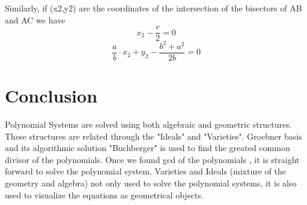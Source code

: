 \documentclass[11pt]{article}
\begin{document}
Similarly, if (x2,y2) are the coordinates of the intersection of the bisectors of AB and AC we have
\begin{equation}
    x_2- \frac {c}{2}=0
\end{equation}
\begin{equation}
    \frac {a}{b} \cdotp x_2 + y_2 - \frac {b^2 + a^2}{2b} = 0
\end{equation}

\section{Conclusion}
Polynomial Systems are solved using both algebraic and geometric structures. These structures are related through the "Ideals" and "Varieties". Groebner basis and its algorithmic solution "Buchberger" is used to find the greated common divisor of the polynomials. Once we found gcd of the polynomials , it is straight forward to solve the polynomial system.
Varieties and Ideals (mixture of the geometry and algebra) not only used to solve the polynomial systems, it is also used to visualize the equations as geometrical objects.
\end{document}
